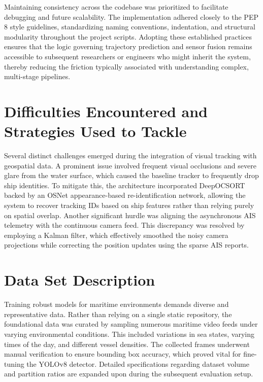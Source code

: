 Maintaining consistency across the codebase was prioritized to facilitate debugging and future scalability. The implementation adhered closely to the PEP 8 style guidelines, standardizing naming conventions, indentation, and structural modularity throughout the project scripts. Adopting these established practices ensures that the logic governing trajectory prediction and sensor fusion remains accessible to subsequent researchers or engineers who might inherit the system, thereby reducing the friction typically associated with understanding complex, multi-stage pipelines.

\section{Difficulties Encountered and Strategies Used to Tackle}

Several distinct challenges emerged during the integration of visual tracking with geospatial data. A prominent issue involved frequent visual occlusions and severe glare from the water surface, which caused the baseline tracker to frequently drop ship identities. To mitigate this, the architecture incorporated DeepOCSORT backed by an OSNet appearance-based re-identification network, allowing the system to recover tracking IDs based on ship features rather than relying purely on spatial overlap. Another significant hurdle was aligning the asynchronous AIS telemetry with the continuous camera feed. This discrepancy was resolved by employing a Kalman filter, which effectively smoothed the noisy camera projections while correcting the position updates using the sparse AIS reports.

\section{Data Set Description}

Training robust models for maritime environments demands diverse and representative data. Rather than relying on a single static repository, the foundational data was curated by sampling numerous maritime video feeds under varying environmental conditions. This included variations in sea states, varying times of the day, and different vessel densities. The collected frames underwent manual verification to ensure bounding box accuracy, which proved vital for fine-tuning the YOLOv8 detector. Detailed specifications regarding dataset volume and partition ratios are expanded upon during the subsequent evaluation setup.

